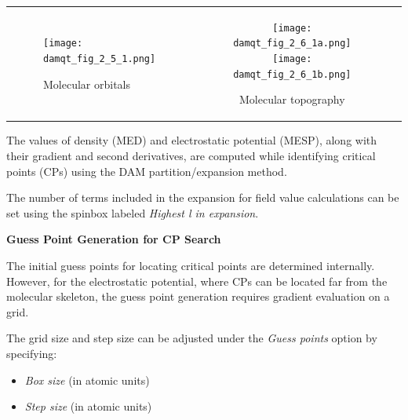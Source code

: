 \documentclass[10pt]{article}
\begin{document}
\begin{tabular}{lcr}
\begin{minipage}{.53\linewidth}
\begin{figure}[H]
\begin{center}
\vspace*{-6.4mm}
\texttt{[image: damqt\_fig\_2\_5\_1.png]}
\end{center}
\caption{{Molecular orbitals}\label{fig:2_5_1}}
\end{figure}
\end{minipage}
&
\begin{minipage}{.47\linewidth}
\begin{figure}[H]
\begin{center}
\vspace*{-8mm}
\texttt{[image: damqt\_fig\_2\_6\_1a.png]}
\texttt{[image: damqt\_fig\_2\_6\_1b.png]}
\end{center}
\caption{Molecular topography \label{fig:2_6_1}}
\end{figure}
\end{minipage}
\end{tabular}

\vspace*{5mm}

The values of density (MED) and electrostatic potential (MESP),
along with their gradient and second derivatives,
are computed while identifying critical points (CPs)
using the DAM partition/expansion method.

The number of terms included in the expansion for field value calculations
can be set using the spinbox labeled {\it Highest l in expansion}.

\vspace*{3mm}
{\bf Guess Point Generation for CP Search}
\vspace*{3mm}

The initial guess points for locating critical points
are determined internally. However, for the electrostatic potential,
where CPs can be located far from the molecular skeleton,
the guess point generation requires gradient evaluation on a grid.

The grid size and step size can be adjusted
under the {\it Guess points} option by specifying:

\begin{itemize}
\item {\it Box size} (in atomic units)
\item {\it Step size} (in atomic units)
\end{itemize}
\end{document}
